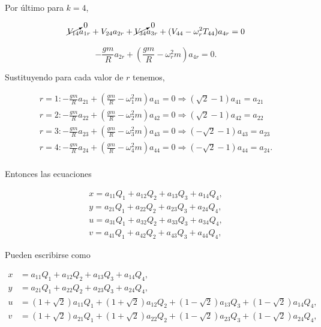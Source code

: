 \documentclass[a4paper,10pt]{article}
\numberwithin{equation}{section}
\begin{document}
Por último para $k=4$, 

\begin{equation}
 \cancelto{0}{V_{14}}a_{1r} + V_{24}a_{2r} + \cancelto{0}{V_{34}}a_{3r} + (V_{44} - \omega_r^2T_{44})a_{4r} = 0
\end{equation}

\begin{equation}
 -\frac{gm}{R}a_{2r} + \left(\frac{gm}{R} - \omega_r^2m\right)a_{4r} = 0.
\end{equation}

Sustituyendo para cada valor de $r$ tenemos,

\begin{align}
 r = 1:  - \frac{gm}{R} a_{21} + \left(\frac{gm}{R} -  \omega_1^2m\right)a_{41}  = 0 \Rightarrow
 (\sqrt{2} -1)a_{41} = a_{21} \\
 r = 2: - \frac{gm}{R} a_{22} + \left(\frac{gm}{R} -  \omega_2^2m\right)a_{42} = 0 \Rightarrow
 (\sqrt{2} -1)a_{42} = a_{22} \\
 r = 3:  - \frac{gm}{R} a_{23} + \left(\frac{gm}{R} -  \omega_3^2m\right)a_{43} = 0 \Rightarrow
 (- \sqrt{2} -1)a_{43} = a_{23} \\
 r = 4:  - \frac{gm}{R} a_{24} + \left(\frac{gm}{R} -  \omega_4^2m\right)a_{44} = 0 \Rightarrow
 (- \sqrt{2} -1)a_{44} = a_{24}. \\
\end{align}

Entonces las ecuaciones 

\begin{align}
 x = a_{11}Q_1 + a_{12}Q_2 + a_{13}Q_3 + a_{14}Q_4, \\
 y = a_{21}Q_1 + a_{22}Q_2 + a_{23}Q_3 + a_{24}Q_4, \\
 u = a_{31}Q_1 + a_{32}Q_2 + a_{33}Q_3 + a_{34}Q_4, \\
 v = a_{41}Q_1 + a_{42}Q_2 + a_{43}Q_3 + a_{44}Q_4,
\end{align}

Pueden escribirse como

\begin{align}
 x &= a_{11}Q_1 + a_{12}Q_2 + a_{13}Q_3 + a_{14}Q_4, \\
 y &= a_{21}Q_1 + a_{22}Q_2 + a_{23}Q_3 + a_{24}Q_4, \\
 u &= (1+\sqrt{2})a_{11}Q_1 + (1+\sqrt{2})a_{12}Q_2 + (1-\sqrt{2})a_{13}Q_3 + (1-\sqrt{2})a_{14}Q_4, \\
 v &= (1+\sqrt{2})a_{21}Q_1 + (1+\sqrt{2})a_{22}Q_2 + (1-\sqrt{2})a_{23}Q_3 + (1-\sqrt{2})a_{24}Q_4,
\end{align}
\end{document}
